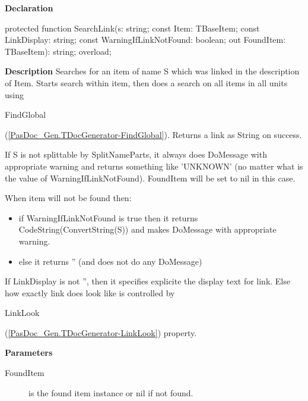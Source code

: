 \documentclass{report}
\newif\ifpdf
\begin{document}
\label{PasDoc_Gen.TDocGenerator-SearchLink}
\begin{list}{}{
\setlength{\itemindent}{0cm}
\setlength{\listparindent}{0cm}
\setlength{\leftmargin}{\evensidemargin}
\addtolength{\leftmargin}{\tmplength}
\settowidth{\labelsep}{X}
\addtolength{\leftmargin}{\labelsep}
\setlength{\labelwidth}{\tmplength}
}
\item[\textbf{Declaration}\hfill]
\ifpdf
\begin{flushleft}
\fi
\begin{ttfamily}
protected function SearchLink(s: string; const Item: TBaseItem; const LinkDisplay: string; const WarningIfLinkNotFound: boolean; out FoundItem: TBaseItem): string; overload;\end{ttfamily}

\ifpdf
\end{flushleft}
\fi

\par
\item[\textbf{Description}]
Searches for an item of name S which was linked in the description of Item. Starts search within item, then does a search on all items in all units using \begin{ttfamily}FindGlobal\end{ttfamily}(\ref{PasDoc_Gen.TDocGenerator-FindGlobal}). Returns a link as String on success.

If S is not splittable by SplitNameParts, it always does DoMessage with appropriate warning and returns something like 'UNKNOWN' (no matter what is the value of WarningIfLinkNotFound). FoundItem will be set to nil in this case.

When item will not be found then: \begin{itemize}
\item  if WarningIfLinkNotFound is true then it returns CodeString(ConvertString(S)) and makes DoMessage with appropriate warning.
\item else it returns '' (and does not do any DoMessage)
\end{itemize}

If LinkDisplay is not '', then it specifies explicite the display text for link. Else how exactly link does look like is controlled by \begin{ttfamily}LinkLook\end{ttfamily}(\ref{PasDoc_Gen.TDocGenerator-LinkLook}) property.

\par
\item[\textbf{Parameters}]
\begin{description}
\item[FoundItem] is the found item instance or nil if not found.
\end{description}


\end{list}
\end{document}

